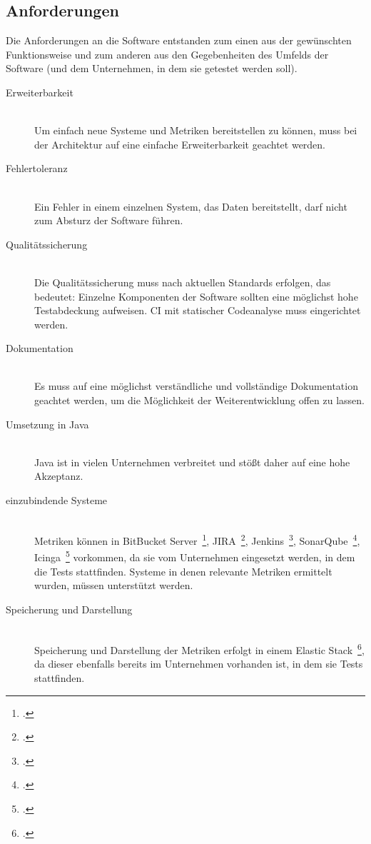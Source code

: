 \subsection{Anforderungen}\label{vorgehen:software}

Die Anforderungen an die Software entstanden zum einen aus der gewünschten Funktionsweise und zum anderen aus den Gegebenheiten des Umfelds der Software (und dem Unternehmen, in dem sie getestet werden soll).

\begin{description}
    \item[Erweiterbarkeit] \hfill \\ Um einfach neue Systeme und Metriken bereitstellen zu können, muss bei der Architektur auf eine einfache Erweiterbarkeit geachtet werden.
    \item[Fehlertoleranz] \hfill \\ Ein Fehler in einem einzelnen System, das Daten bereitstellt, darf nicht zum Absturz der Software führen.
    \item[Qualitätssicherung] \hfill \\ Die Qualitätssicherung muss nach aktuellen Standards erfolgen, das bedeutet: Einzelne Komponenten der Software sollten eine möglichst hohe Testabdeckung aufweisen. \ac{CI} mit statischer Codeanalyse muss eingerichtet werden.
    \item[Dokumentation] \hfill \\ Es muss auf eine möglichst verständliche und vollständige Dokumentation geachtet werden, um die Möglichkeit der Weiterentwicklung offen zu lassen.
    \item[Umsetzung in Java] \hfill \\ Java ist in vielen Unternehmen verbreitet und stößt daher auf eine hohe Akzeptanz.
    \item[einzubindende Systeme] \hfill \\ Metriken können in BitBucket Server~\footcite{bitbucket_server}, JIRA~\footcite{jira}, Jenkins~\footcite{jenkins}, SonarQube~\footcite{sonarqube}, Icinga~\footcite{icinga} vorkommen, da sie vom Unternehmen eingesetzt werden, in dem die Tests stattfinden. Systeme in denen relevante Metriken ermittelt wurden, müssen unterstützt werden.
    \item[Speicherung und Darstellung] \hfill \\ Speicherung und Darstellung der Metriken erfolgt in einem Elastic Stack~\footcite{elastic_stack}, da dieser ebenfalls bereits im Unternehmen vorhanden ist, in dem sie Tests stattfinden.
\end{description}


